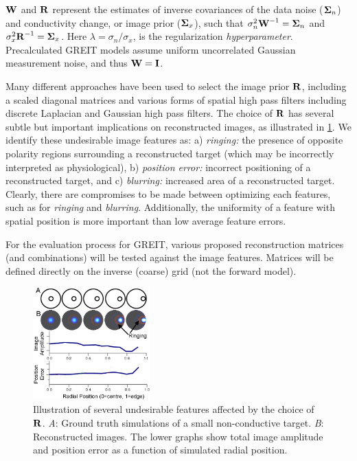 \documentclass[letterpaper,twocolumn,10pt]{article}
\newcommand{\RB}{\mbox{$\bf R$}}
\newcommand{\WB}{\mbox{$\bf W$}}
\newcommand{\IB}{\mbox{$\bf I$}}
\newcommand{\SG}{\mbox{$\bf \Sigma$}}
\begin{document}
\begin{list}{\bf {}.}
$\WB$ and $\RB$ represent the estimates of inverse covariances
of the data noise ($\SG_n$) and conductivity change, or
image prior ($\SG_x$), such that
$\sigma_n^2 \WB^{-1}= \SG_n$ and
$\sigma_x^2 \RB^{-1}= \SG_x$. Here $\lambda= \sigma_n/\sigma_x$,
is the regularization {\em hyperparameter}.
Precalculated GREIT models assume uniform uncorrelated
Gaussian measurement noise, and thus $\WB = \IB$.

Many different approaches have been used to select
the image prior $\RB$, including a scaled diagonal
matrices and various forms of spatial high pass
filters including discrete Laplacian and Gaussian
high pass filters. The choice of $\RB$ has several
subtle but important implications on reconstructed
images, as illustrated in \ref{fig:prior_effects}.
We identify these undesirable image features as:
a) {\em ringing:} the presence of opposite polarity
regions surrounding a reconstructed target (which
may be incorrectly interpreted as physiological),
b) {\em position error:} incorrect positioning of
a reconstructed target,
and 
c) {\em blurring:} increased area of a reconstructed
target.
Clearly, there are compromises to be made between
optimizing each features, such as for {\em ringing} and
{\em blurring}. Additionally, the uniformity of
a feature with spatial position is more important
than low average feature errors.

For the evaluation process for GREIT, various
proposed reconstruction matrices (and combinations)
will be tested against the image features. Matrices
will be defined directly on the inverse (coarse) grid
(not the forward model).


\begin{figure}[tbh]
\begin{center}
 \includegraphics[width= 0.4\textwidth, bb=0 0 512 532]{figs/spatial-uniformity.png}
\caption{ \label{fig:prior_effects}
\small
Illustration of several undesirable features affected by the
choice of $\RB$. {\em A}: Ground truth simulations of a small
non-conductive target. {\em B}: Reconstructed images. The
lower graphs show total image amplitude and position error
as a function of simulated radial position.%
}
\end{center}
\end{figure}


\end{list}
\end{document}
